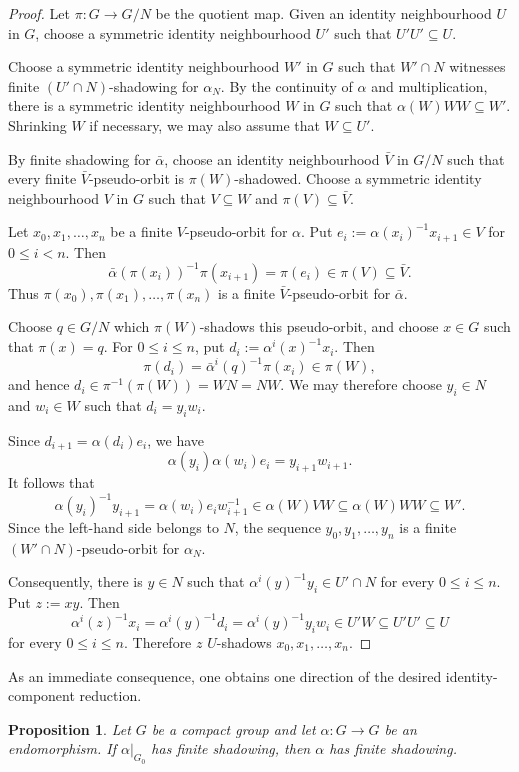 \documentclass[12pt]{amsart}
\newtheorem{proposition}[theorem]{Proposition}
\theoremstyle{definition}
\numberwithin{equation}{section}
\theoremstyle{remark}
\begin{document}
\begin{proof}
Let $\pi:G\to G/N$ be the quotient map. Given an identity
neighbourhood $U$ in $G$, choose a symmetric identity neighbourhood
$U'$ such that $U'U'\subseteq U$.

Choose a symmetric identity neighbourhood $W'$ in $G$ such that
$W'\cap N$ witnesses finite $(U'\cap N)$-shadowing for $\alpha_N$.
By the continuity of $\alpha$ and multiplication, there is a symmetric
identity neighbourhood $W$ in $G$ such that
$\alpha(W)WW\subseteq W'$. Shrinking $W$ if necessary, we may also
assume that $W\subseteq U'$.

By finite shadowing for $\bar\alpha$, choose an identity neighbourhood
$\bar V$ in $G/N$ such that every finite $\bar V$-pseudo-orbit is
$\pi(W)$-shadowed. Choose a symmetric identity neighbourhood $V$ in
$G$ such that $V\subseteq W$ and $\pi(V)\subseteq\bar V$.

Let $x_0,x_1,\ldots,x_n$ be a finite $V$-pseudo-orbit for $\alpha$.
Put $e_i:=\alpha(x_i)^{-1}x_{i+1}\in V$ for $0\leq i<n$. Then
\[
\bar\alpha(\pi(x_i))^{-1}\pi(x_{i+1})
=\pi(e_i)\in\pi(V)\subseteq\bar V.
\]
Thus $\pi(x_0),\pi(x_1),\ldots,\pi(x_n)$ is a finite
$\bar V$-pseudo-orbit for $\bar\alpha$.

Choose $q\in G/N$ which $\pi(W)$-shadows this pseudo-orbit, and choose
$x\in G$ such that $\pi(x)=q$. For $0\leq i\leq n$, put
$d_i:=\alpha^i(x)^{-1}x_i$. Then
\[
\pi(d_i)
=\bar\alpha^i(q)^{-1}\pi(x_i)\in\pi(W),
\]
and hence $d_i\in\pi^{-1}(\pi(W))=WN=NW$. We may therefore choose
$y_i\in N$ and $w_i\in W$ such that $d_i=y_iw_i$.

Since $d_{i+1}=\alpha(d_i)e_i$, we have
\[
\alpha(y_i)\alpha(w_i)e_i=y_{i+1}w_{i+1}.
\]
It follows that
\[
\alpha(y_i)^{-1}y_{i+1}
=\alpha(w_i)e_iw_{i+1}^{-1}
\in\alpha(W)VW
\subseteq\alpha(W)WW
\subseteq W'.
\]
Since the left-hand side belongs to $N$, the sequence
$y_0,y_1,\ldots,y_n$ is a finite $(W'\cap N)$-pseudo-orbit for
$\alpha_N$.

Consequently, there is $y\in N$ such that
$\alpha^i(y)^{-1}y_i\in U'\cap N$ for every $0\leq i\leq n$. Put
$z:=xy$. Then
\[
\alpha^i(z)^{-1}x_i
=\alpha^i(y)^{-1}d_i
=\alpha^i(y)^{-1}y_iw_i
\in U'W
\subseteq U'U'
\subseteq U
\]
for every $0\leq i\leq n$. Therefore $z$ $U$-shadows
$x_0,x_1,\ldots,x_n$.
\end{proof}


As an immediate consequence, one obtains one direction of the desired
identity-component reduction.

\begin{proposition}\label{prop:component-to-group}
Let $G$ be a compact group and let $\alpha:G\to G$ be an endomorphism.
If $\alpha|_{G_0}$ has finite shadowing, then $\alpha$ has finite
shadowing.
\end{proposition}
\end{document}
